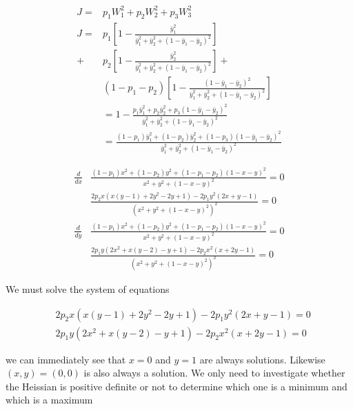 \begin{align*}
	J = &p_1 W_1^2 + p_2 W_2^2 + p_3 W_3^2 \\
	J = &p_1[1 - \frac{\bar{y}_1^2}{\bar{y}_1^2 + \bar{y}_2^2 + (1 - \bar{y}_1 - \bar{y}_2 )^2}] \\
	+ &p_2 [1 - \frac{\bar{y}_2^2}{\bar{y}_1^2 + \bar{y}_2^2 + (1 - \bar{y}_1 - \bar{y}_2 )^2}] + \\
	  &(1-p_1 - p_2) [1 -\frac{(1-\bar{y}_1 - \bar{y}_2)^2}{\bar{y}_1^2 + \bar{y}_2^2 + (1 - \bar{y}_1 - \bar{y}_2 )^2} ] \\
	  &= 1 - \frac{p_1 \bar{y}_1^2 + p_2\bar{y}_2^2 + p_3(1 - \bar{y}_1 - \bar{y}_2 )^2}{\bar{y}_1^2 + \bar{y}_2^2 + (1 - \bar{y}_1 - \bar{y}_2 )^2} \\
	  &= \frac{(1-p_1) \bar{y}_1^2 + (1-p_2)\bar{y}_2^2 + (1-p_3)(1 - \bar{y}_1 - \bar{y}_2 )^2}{\bar{y}_1^2 + \bar{y}_2^2 + (1 - \bar{y}_1 - \bar{y}_2 )^2}
\end{align*}


\begin{align*}
	\frac{d}{dx}& \frac{ (1 - p_1) x^2 + (1 - p_2) y^2 + (1 - p_1 - p_2) (1 - x - y)^2 }{ x^2 + y^2 + (1 - x - y)^2 } = 0 \\
	&\frac{ 2 p_2 x (x (y - 1) + 2 y^2 - 2 y + 1) - 2 p_1 y^2 (2 x + y - 1) }{( x^2 + y^2 + (1 - x - y)^2 )^2} = 0\\
	\frac{d}{dy} &\frac{ (1 - p_1) x^2 + (1 - p_2) y^2 + (1 - p_1 - p_2) (1 - x - y)^2 }{ x^2 + y^2 + (1 - x - y)^2 } = 0 \\
				 &\frac{ 2 p_1 y (2 x^2 + x (y - 2) - y + 1) - 2 p_2 x^2 (x + 2 y - 1) }{( x^2 + y^2 + (1 - x - y)^2 )^2} = 0
\end{align*} 

We must solve the system of equations

\begin{align*}
	&2 p_2 x (x (y - 1) + 2 y^2 - 2 y + 1) - 2 p_1 y^2 (2 x + y - 1) = 0 \\
	&2 p_1 y (2 x^2 + x (y - 2) - y + 1) - 2 p_2 x^2 (x + 2 y - 1) = 0
\end{align*} 

we can immediately see that $x=0$ and $y=1$ are always solutions. Likewise $(x,y) = (0,0)$ is also always a solution.
We only need to investigate whether the Heissian is positive definite or not to determine which one is a minimum and which is a maximum


